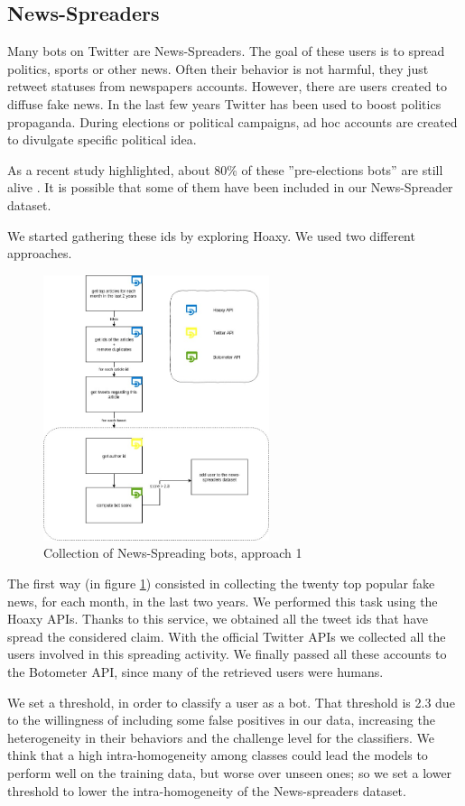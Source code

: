 \subsection{News-Spreaders}
Many bots on Twitter are News-Spreaders. The goal of these users is to spread politics, sports or other news. Often their behavior is not harmful, they just retweet statuses from newspapers accounts. However, there are users created to diffuse fake news. In the last few years Twitter has been used to boost politics propaganda. During elections or political campaigns, ad hoc accounts are created to divulgate specific political idea.

As a recent study highlighted, about 80\% of these ''pre-elections bots'' are still alive \cite{Disinformation}. It is possible that some of them have been included in our News-Spreader dataset.

We started gathering these ids by exploring Hoaxy.
We used two different approaches.
\begin{figure}[t]
	\centering
	\includegraphics[width=250px]{chapter3/figure/news-spreader.jpg}
	\caption{Collection of News-Spreading bots, approach 1}
	\label{fig:News-Spreaders}
\end{figure}
The first way (in figure \ref{fig:News-Spreaders}) consisted in collecting the twenty top popular fake news, for each month, in the last two years. We performed this task using the Hoaxy APIs. Thanks to this service, we obtained all the tweet ids that have spread the considered claim. With the official Twitter APIs we collected all the users involved in this spreading activity. We finally passed all these accounts to the Botometer API, since many of the retrieved users were humans.

We set a threshold, in order to classify a user as a bot. That threshold is 2.3 due to the willingness of including some false positives in our data, increasing the heterogeneity in their behaviors and the challenge level for the classifiers. We think that a high intra-homogeneity among classes could lead the models to perform well on the training data, but worse over unseen ones; so we set a lower threshold to lower the intra-homogeneity of the News-spreaders dataset.

